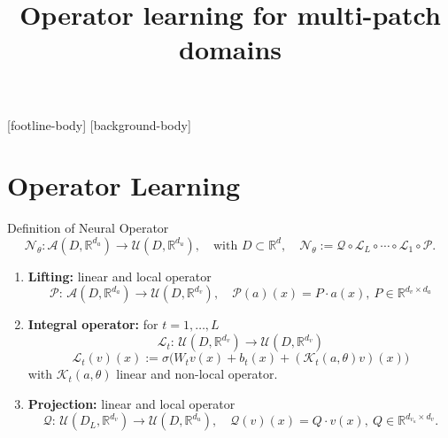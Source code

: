 \documentclass{beamer}
\title{Operator learning \newline for multi-patch domains}
\subtitle{}
\newcommand{\numberset}{\mathbb}
\newcommand{\R}{\numberset{R}}
\begin{document}
\frame{\titlepage}

\addtocounter{framenumber}{-1}
[footline-body]
[background-body]


\section{Operator Learning}


\begin{frame}[t]{Definition of Neural Operator}
	\vspace{-0.5cm}
	\[ \mathcal{N}_{\theta} :\mathcal{A}(D, \R^{d_a}) \to \mathcal{U}(D, \R^{d_{u}}), \quad \text{with } D \subset \R^d, \quad	\mathcal{N}_{\theta} := \mathcal{Q} \circ \mathcal{L}_L \circ \cdots \circ \mathcal{L}_1 \circ \mathcal{P} . \]
	\vspace{-0.2cm}
	\begin{enumerate}
		\item \textbf{Lifting:} linear and local operator 
			\[\mathcal{P}:\, \mathcal{A}(D, \R^{d_a}) \to \mathcal{U}(D, \R^{d_{v}}), \quad  \mathcal{P}(a)(x) = P\cdot a(x), \ P \in \R^{d_{v} \times d_a} \]
	\vspace{-0.2cm}
		\pause
		\item \textbf{Integral operator:} for $ t = 1, \dots, L $
		\[ \mathcal{L}_t : \, \mathcal{U}(D, \R^{d_{v}}) \to  \mathcal{U}(D, \R^{d_{v}}) \]
		\[  \mathcal{L}_t(v)(x) := \sigma\Big( W_t v(x)+ b_t(x) + (\mathcal{K}_t(a, \theta) v)(x) \Big) \]
		with $ \mathcal{K}_t(a, \theta) $ linear and non-local operator.  
		\pause
		\item \textbf{Projection:} linear and local operator 
		\[\mathcal{Q}:\, \mathcal{U}(D_{L}, \R^{d_{v}}) \to  \mathcal{U}(D, \R^{d_{u}}), \quad  \mathcal{Q}(v)(x) = Q\cdot v(x), \ Q \in \R^{d_{v_u} \times d_{v}}. \]		
	\end{enumerate}
\end{frame}

\end{document}
